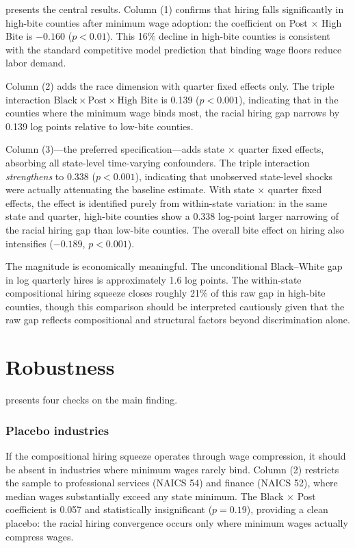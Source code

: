 \documentclass[12pt]{article}
\begin{document}
 presents the central results. Column (1) confirms that hiring falls significantly in high-bite counties after minimum wage adoption: the coefficient on Post $\times$ High Bite is $-0.160$ ($p < 0.01$). This 16\% decline in high-bite counties is consistent with the standard competitive model prediction that binding wage floors reduce labor demand.

Column (2) adds the race dimension with quarter fixed effects only. The triple interaction $\text{Black} \times \text{Post} \times \text{High Bite}$ is 0.139 ($p < 0.001$), indicating that in the counties where the minimum wage binds most, the racial hiring gap narrows by 0.139 log points relative to low-bite counties.

Column (3)---the preferred specification---adds state $\times$ quarter fixed effects, absorbing all state-level time-varying confounders. The triple interaction \textit{strengthens} to 0.338 ($p < 0.001$), indicating that unobserved state-level shocks were actually attenuating the baseline estimate. With state $\times$ quarter fixed effects, the effect is identified purely from within-state variation: in the same state and quarter, high-bite counties show a 0.338 log-point larger narrowing of the racial hiring gap than low-bite counties. The overall bite effect on hiring also intensifies ($-0.189$, $p < 0.001$).

The magnitude is economically meaningful. The unconditional Black--White gap in log quarterly hires is approximately 1.6 log points. The within-state compositional hiring squeeze closes roughly 21\% of this raw gap in high-bite counties, though this comparison should be interpreted cautiously given that the raw gap reflects compositional and structural factors beyond discrimination alone.


\section{Robustness}

 presents four checks on the main finding.

\subsubsection*{Placebo industries} If the compositional hiring squeeze operates through wage compression, it should be absent in industries where minimum wages rarely bind. Column (2) restricts the sample to professional services (NAICS 54) and finance (NAICS 52), where median wages substantially exceed any state minimum. The Black $\times$ Post coefficient is 0.057 and statistically insignificant ($p = 0.19$), providing a clean placebo: the racial hiring convergence occurs only where minimum wages actually compress wages.
\end{document}
